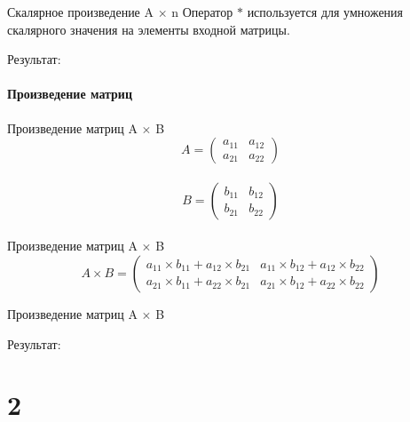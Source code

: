\documentclass[12pt]{beamer}
\begin{document}
\begin{frame}{Скалярное произведение  A $\times$ n}
Оператор $*$ используется для умножения скалярного значения на элементы входной матрицы.
\vspace{0.2cm}

Результат: \\

\end{frame}


\subsection{Произведение матриц}
\begin{frame}{Произведение матриц A $\times$ B}
\[
  A = 
  \begin{pmatrix}
    a_{11} & a_{12} \\
    a_{21} & a_{22} 
  \end{pmatrix} 
\]
\\
\[
  B = 
  \begin{pmatrix}
    b_{11} & b_{12} \\
    b_{21} & b_{22} 
  \end{pmatrix}
\]
\\
\vspace{0.5cm}
Произведение матриц A $\times$ B
\\
\[
  A \times B = 
  \begin{pmatrix}
    a_{11} \times b_{11} + a_{12} \times b_{21} & a_{11} \times b_{12} + a_{12} \times b_{22} \\
    a_{21} \times b_{11} + a_{22} \times b_{21} & a_{21} \times b_{12} + a_{22} \times b_{22} 
  \end{pmatrix}
\]
\end{frame}



\begin{frame}{Произведение матриц A $\times$ B}

Результат: \\

\end{frame}



\part{2}
\end{document}
